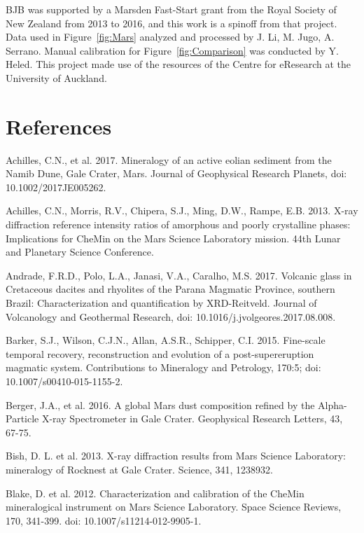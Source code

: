 \documentclass[review]{elsarticle}
\begin{document}
BJB was supported by a Marsden Fast-Start grant from the Royal Society of
New Zealand from 2013 to 2016, and this work is a spinoff from that
project. Data used in Figure~\ref{fig:Mars} analyzed and processed by J. Li, M. Jugo, A. Serrano. Manual calibration for Figure~\ref{fig:Comparison} was conducted by Y. Heled. This project made use of the resources of the Centre for
eResearch at the University of Auckland.

\section*{References}
\begin{thebibliography}{99}


Achilles, C.N., et al. 2017. Mineralogy of an active eolian sediment from the Namib Dune, Gale Crater, Mars. Journal of Geophysical Research Planets, doi: 10.1002/2017JE005262.

Achilles, C.N., Morris, R.V., Chipera, S.J., Ming, D.W., Rampe, E.B. 2013. X-ray diffraction reference intensity ratios of amorphous and poorly crystalline phases: Implications for CheMin on the Mars Science Laboratory mission. 44th Lunar and Planetary Science Conference.

Andrade, F.R.D., Polo, L.A., Janasi, V.A., Caralho, M.S. 2017. Volcanic glass in Cretaceous dacites and rhyolites of the Parana Magmatic Province, southern Brazil: Characterization and quantification by XRD-Reitveld. Journal of Volcanology and Geothermal Research, doi: 10.1016/j.jvolgeores.2017.08.008.

Barker, S.J., Wilson, C.J.N., Allan, A.S.R., Schipper, C.I. 2015. Fine-scale temporal recovery, reconstruction and evolution of a post-supereruption magmatic system. Contributions to Mineralogy and Petrology, 170:5; doi: 10.1007/s00410-015-1155-2.

Berger, J.A., et al. 2016. A global Mars dust composition refined by the Alpha-Particle X-ray Spectrometer in Gale Crater. Geophysical Research Letters, 43, 67-75.

Bish, D. L. et al. 2013. X-ray diffraction results from Mars Science Laboratory: mineralogy of Rocknest at Gale Crater. Science, 341, 1238932.

Blake, D. et al. 2012. Characterization and calibration of the CheMin mineralogical instrument on Mars Science Laboratory. Space Science Reviews, 170, 341-399. doi: 10.1007/s11214-012-9905-1.


\end{thebibliography}
\end{document}
